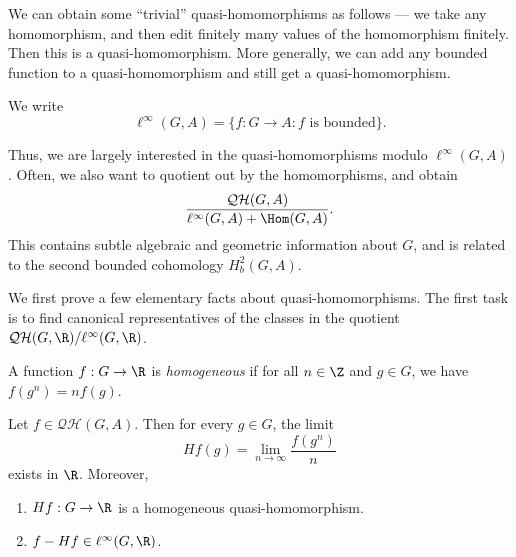 \documentclass[a4paper]{article}
\newcommand\QH{\mathcal{QH}}
\begin{document}
We can obtain some ``trivial'' quasi-homomorphisms as follows --- we take any homomorphism, and then edit finitely many values of the homomorphism finitely. Then this is a quasi-homomorphism. More generally, we can add any bounded function to a quasi-homomorphism and still get a quasi-homomorphism.

\begin{notation}
  We write
  \[
    \ell^\infty(G, A) = \{f: G \to A: \text{$f$ is bounded}\}.
  \]
\end{notation}

Thus, we are largely interested in the quasi-homomorphisms modulo $\ell^\infty(G, A)$. Often, we also want to quotient out by the homomorphisms, and obtain
\[
  \frac{\QH(G, A)}{\ell^\infty(G, A) + \Hom(G, A)}.
\]
This contains subtle algebraic and geometric information about $G$, and is related to the second bounded cohomology $H_b^2(G, A)$.

We first prove a few elementary facts about quasi-homomorphisms. The first task is to find canonical representatives of the classes in the quotient $\QH(G, \R)/\ell^\infty (G, \R)$.

\begin{defi}
  A function $f: G \to \R$ is \emph{homogeneous} if for all $n \in \Z$ and $g \in G$, we have $f(g^n) = n f(g)$.
\end{defi}

\begin{lemma}
  Let $f \in \QH(G, A)$. Then for every $g \in G$, the limit
  \[
    Hf(g) = \lim_{n \to \infty} \frac{f(g^n)}{n}
  \]
  exists in $\R$. Moreover,
  \begin{enumerate}
    \item $Hf: G \to \R$ is a homogeneous quasi-homomorphism.
    \item $f - Hf \in \ell^\infty(G, \R)$.
  \end{enumerate}
\end{lemma}
\end{document}
